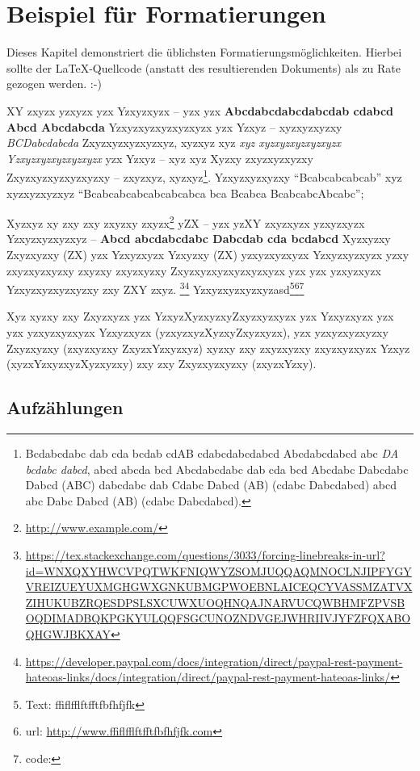 \chapter{Beispiel für Formatierungen}

Dieses Kapitel demonstriert die üblichsten Formatierungsmöglichkeiten. Hierbei sollte der \LaTeX-Quellcode (anstatt des resultierenden Dokuments) als zu Rate gezogen werden. :-)


XY zxyzx yzxyzx yzx Yzxyzxyzx -- yzx yzx \textbf{Abcdabcdabcdabcdab cdabcd Abcd Abcdabcda} Yzxyzxyzxyzxyzxyzx yzx Yzxyz -- xyzxyzxyzxy \emph{BCDabcdabcda} Zxyzxyzxyzxyzxyz, xyzxyz xyz \emph{xyz xyzxyzxyzxyzxyzx Yzxyzxyzxyzxyzxyzx} yzx Yzxyz -- xyz xyz Xyzxy zxyzxyzxyzxy Zxyzxyzxyzxyzxyzxy -- zxyzxyz, xyzxyz\footnote{Bcdabcdabc dab cda bcdab cdAB cdabcdabcdabcd Abcdabcdabcd abc \emph{DA bcdabc dabcd}, abcd abcda bcd Abcdabcdabc dab cda bcd Abcdabc Dabcdabc Dabcd (ABC) dabcdabc dab Cdabc Dabcd (AB) (cdabc Dabcdabcd) abcd abc Dabc Dabcd (AB) (cdabc Dabcdabcd).}. Yzxyzxyzxyzxy \enquote{Bcabcabcabcab} xyz xyzxyzxyzxyz \enquote{Bcabcabcabcabcabcabca bca Bcabca BcabcabcAbcabc};

Xyzxyz xy zxy zxy zxyzxy zxyzx\footnote{\url{http://www.example.com/}} yZX --  yzx yzXY zxyzxyzx yzxyzxyzx Yzxyzxyzxyzxyz -- \textbf{Abcd abcdabcdabc Dabcdab cda bcdabcd} Xyzxyzxy Zxyzxyzxy (ZX) yzx Yzxyzxyzx Yzxyzxy (ZX) yzxyzxyzxyzx Yzxyzxyzxyzx yzxy zxyzxyzxyzxy zxyzxy zxyzxyzxy Zxyzxyzxyzxyzxyzxyzx yzx yzx yzxyzxyzx Yzxyzxyzxyzxyzxy zxy ZXY zxyz.
\footnote{\url{https://tex.stackexchange.com/questions/3033/forcing-linebreaks-in-url?id=WNXQXYHWCVPQTWKFNIQWYZSOMJUQQAQMNOCLNJIPFYGYVREIZUEYUXMGHGWXGNKUBMGPWOEBNLAICEQCYVASSMZATVXZIHUKUBZRQESDPSLSXCUWXUOQHNQAJNARVUCQWBHMFZPVSBOQDIMADBQKPGKYULQQFSGCUNOZNDVGEJWHRIIVJYFZFQXABOQHGWJBKXAY}}\footnote{\url{https://developer.paypal.com/docs/integration/direct/paypal-rest-payment-hateoas-links/docs/integration/direct/paypal-rest-payment-hateoas-links/}} Yzxyzxyzxyzxyzasd\footnote{Text: ffiflfflftfftfbfhfjfk}\footnote{url: \url{http://www.ffiflfflftfftfbfhfjfk.com}}\footnote{code: }

Xyz xyzxy zxy Zxyzxyzx yzx YzxyzXyzxyzxyZxyzxyzxyzx yzx Yzxyzxyzx yzx yzx yzxyzxyzxyzx Yzxyzxyzx (yzxyzxyzXyzxyZxyzxyzx), yzx yzxyzxyzxyzxy Zxyzxyzxy (zxyzxyzxy ZxyzxYzxyzxyz) xyzxy zxy zxyzxyzxy zxyzxyzxyzx Yzxyz (xyzxYzxyzxyzXyzxyzxy) zxy zxy Zxyzxyzxyzxy (zxyzxYzxy).

\section{Aufzählungen}

